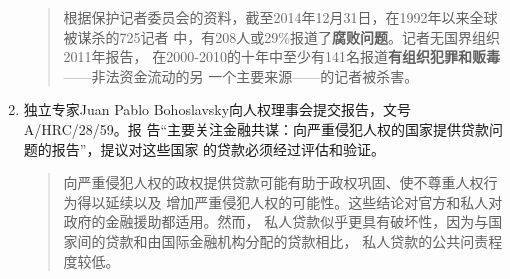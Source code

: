 \begin{enumerate}
\begin{quotation}
    根据保护记者委员会的资料，截至2014年12月31日，在1992年以来全球被谋杀的725记者
    中，有208人或29\%报道了\textbf{腐败问题}。记者无国界组织2011年报告，
    在2000-2010的十年中至少有141名报道\textbf{有组织犯罪和贩毒}——非法资金流动的另
    一个主要来源——的记者被杀害。
  \end{quotation}

\item 独立专家Juan Pablo Bohoslavsky向人权理事会提交报告，文号A/HRC/28/59。报
  告“主要关注金融共谋：向严重侵犯人权的国家提供贷款问题的报告”，提议对这些国家
  的贷款必须经过评估和验证。
  \begin{quotation}
    向严重侵犯人权的政权提供贷款可能有助于政权巩固、使不尊重人权行为得以延续以及
    增加严重侵犯人权的可能性。这些结论对官方和私人对政府的金融援助都适用。然而，
    私人贷款似乎更具有破坏性，因为与国家间的贷款和由国际金融机构分配的贷款相比，
    私人贷款的公共问责程度较低。
  \end{quotation}
\end{enumerate}








